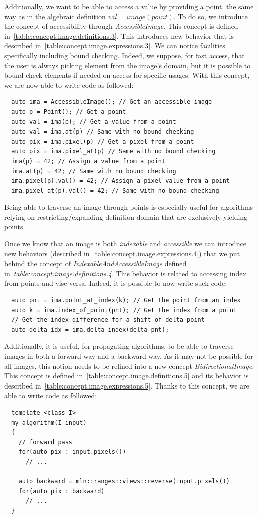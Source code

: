 Additionally, we want to be able to access a value by providing a point, the same way as in the algebraic definition
\(val = image(point)\). To do so, we introduce the concept of accessibility through \emph{AccessibleImage}. This concept
is defined in~\cref{table:concept.image.definitions.3}. This introduces new behavior that is described
in~\cref{table:concept.image.expressions.3}. We can notice facilities specifically including bound checking. Indeed, we
suppose, for fast access, that the user is always picking element from the image's domain, but it is possible to bound
check elements if needed on access for specific usages. With this concept, we are now able to write code as followed:
\begin{verbatim}
  auto ima = AccessibleImage(); // Get an accessible image
  auto p = Point(); // Get a point
  auto val = ima(p); // Get a value from a point
  auto val = ima.at(p) // Same with no bound checking
  auto pix = ima.pixel(p) // Get a pixel from a point
  auto pix = ima.pixel_at(p) // Same with no bound checking
  ima(p) = 42; // Assign a value from a point
  ima.at(p) = 42; // Same with no bound checking
  ima.pixel(p).val() = 42; // Assign a pixel value from a point
  ima.pixel_at(p).val() = 42; // Same with no bound checking
\end{verbatim}
Being able to traverse an image through points is especially useful for algorithms relying on restricting/expanding
definition domain that are exclusively yielding points.

Once we know that an image is both \emph{indexable} and \emph{accessible} we can introduce new behaviors (described
in~\cref{table:concept.image.expressions.4}) that we put behind the concept of \emph{IndexableAndAccessibleImage}
defined in~\emph{table:concept.image.definitions.4}. This behavior is related to accessing index from points and vise
versa. Indeed, it is possible to now write such code:
\begin{verbatim}
  auto pnt = ima.point_at_index(k); // Get the point from an index
  auto k = ima.index_of_point(pnt); // Get the index from a point
  // Get the index difference for a shift of delta_point
  auto delta_idx = ima.delta_index(delta_pnt);
\end{verbatim}

Additionally, it is useful, for propagating algorithms, to be able to traverse images in both a forward way and a
backward way. As it may not be possible for all images, this notion needs to be refined into a new concept
\emph{BidirectionalImage}. This concept is defined in~\cref{table:concept.image.definitions.5} and its behavior is
described in~\cref{table:concept.image.expressions.5}. Thanks to this concept, we are able to write code as followed:
\begin{verbatim}
  template <class I>
  my_algorithm(I input)
  {
    // forward pass
    for(auto pix : input.pixels())
      // ...

    auto backward = mln::ranges::views::reverse(input.pixels())
    for(auto pix : backward)
      // ...
  }
\end{verbatim}

